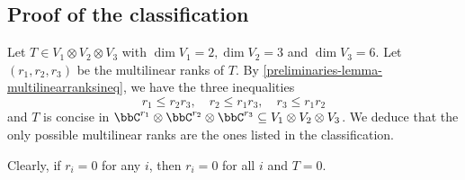 % 

\subsection{Proof of the classification}


Let $T \in V_1 \otimes V_2 \otimes V_3$ with $\dim V_1 =2, \dim V_2 = 3$ and $\dim V_3 = 6$. Let $(r_1,r_2,r_3)$ be the multilinear ranks of $T$. By \ref{preliminaries-lemma-multilinearranksineq}, we have the three inequalities
\[
r_1 \leq r_2r_3, \quad r_2 \leq r_1r_3, \quad r_3 \leq r_1r_2
\]
and $T$ is concise in $\bbC^{r_1} \otimes \bbC^{r_2} \otimes \bbC^{r_3} \subseteq V_1 \otimes V_2 \otimes V_3$. We deduce that the only possible multilinear ranks are the ones listed in the classification.

Clearly, if $r_i = 0$ for any $i$, then $r_i = 0$ for all $i$ and $T = 0$.

